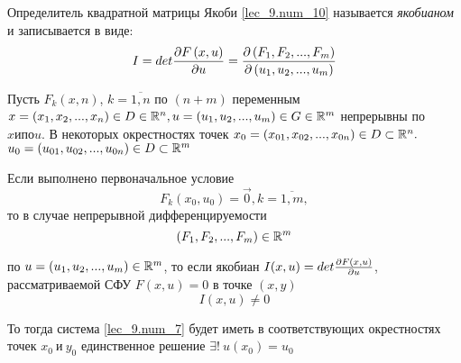 \documentclass[../../main.tex]{subfiles}
\begin{document}
Определитель квадратной матрицы Якоби 
    \eqref{lec_9.num_10} называется \emph{якобианом}
и записывается в виде:
\begin{equation}
    \label{lec_9.num_11}   
    I = det\frac{\partial F\left(x,u\right)}{\partial u} =
    \frac{\partial \left(F_1,F_2,...,F_m\right)}{\partial \left(u_1, u_2,..., u_m\right)}
\end{equation}

\begin{thm}
Пусть $F_k\left(x, n\right)$, $k = \overline{1, n}$
по $(n+ m)$ переменным 
$x = \left(x_1, x_2, ..., x_n\right) \in D \in \mathbb{R}^n,
u = \left(u_1, u_2, ..., u_m\right) \in G \in \mathbb{R}^m$
непрерывны по $x и по u$. В некоторых окрестностях точек
$x_0 = \left(x_{01}, x_{02}, ..., x_{0n}\right) \in D 
\subset \mathbb{R}^n. $
$u_0 = \left(u_{01}, u_{02}, ..., u_{0n}\right) \in D
\subset \mathbb{R}^m$

Если выполнено первоначальное условие
\begin{equation}
    \label{lec_9.num_12}
    F_k(x_0, u_0) = \vec{0}, k = \overline{1, m},
\end{equation}
то в случае непрерывной дифференцируемости
\begin{equation}
    \label{lec_9.num_13}
    \left(F_1, F_2, ..., F_m\right) \in \mathbb{R}^m
\end{equation}

по $u = \left(u_1, u_2, ..., u_m\right) \in \mathbb{R}^m$,
то если якобиан
$I(x, u) = det\frac{\partial F\left(x, u\right)}{\partial u}$, 
рассматриваемой СФУ $F\left(x, u\right) = 0$
в точке $\left(x, y\right)$
\begin{equation}
    \label{lec_9.num_14}
    I(x, u) \neq 0 
\end{equation}

То тогда система \eqref{lec_9.num_7} будет иметь в 
соответствующих окрестностях точек $x_0\ \text{и}\ y_0$
единственное решение $\exists!\ u(x_0) = u_0$
\end{thm}
\end{document}
